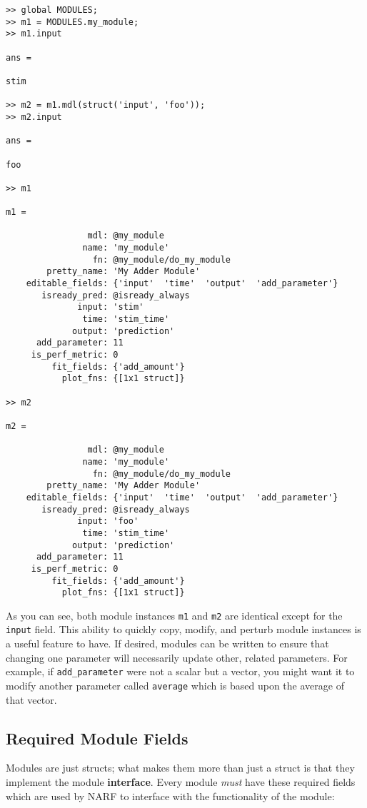 \documentclass[letterpaper]{report}
\newcommand{\definition}[1]{\textbf{#1}}
\newcommand{\matlab}[1]{\texttt{#1}}
\begin{document}
\begin{verbatim}
>> global MODULES;
>> m1 = MODULES.my_module;
>> m1.input

ans =

stim

>> m2 = m1.mdl(struct('input', 'foo'));
>> m2.input

ans =

foo

>> m1

m1 = 

                mdl: @my_module
               name: 'my_module'
                 fn: @my_module/do_my_module
        pretty_name: 'My Adder Module'
    editable_fields: {'input'  'time'  'output'  'add_parameter'}
       isready_pred: @isready_always
              input: 'stim'
               time: 'stim_time'
             output: 'prediction'
      add_parameter: 11
     is_perf_metric: 0
         fit_fields: {'add_amount'}
           plot_fns: {[1x1 struct]}

>> m2

m2 = 

                mdl: @my_module
               name: 'my_module'
                 fn: @my_module/do_my_module
        pretty_name: 'My Adder Module'
    editable_fields: {'input'  'time'  'output'  'add_parameter'}
       isready_pred: @isready_always
              input: 'foo'
               time: 'stim_time'
             output: 'prediction'
      add_parameter: 11
     is_perf_metric: 0
         fit_fields: {'add_amount'}
           plot_fns: {[1x1 struct]}
\end{verbatim}

As you can see, both module instances \matlab{m1} and \matlab{m2} are identical except for the \matlab{input} field. This ability to quickly copy, modify, and perturb module instances is a useful feature to have. If desired, modules can be written to ensure that changing one parameter will necessarily update other, related parameters. For example, if \matlab{add\_parameter} were not a scalar but a vector, you might want it to modify another parameter called \matlab{average} which is based upon the average of that vector. 

\subsection{Required Module Fields}

Modules are just structs; what makes them more than just a struct is that they implement the module \definition{interface}. Every module \emph{must} have these required fields which are used by NARF to interface with the functionality of the module:
\end{document}
